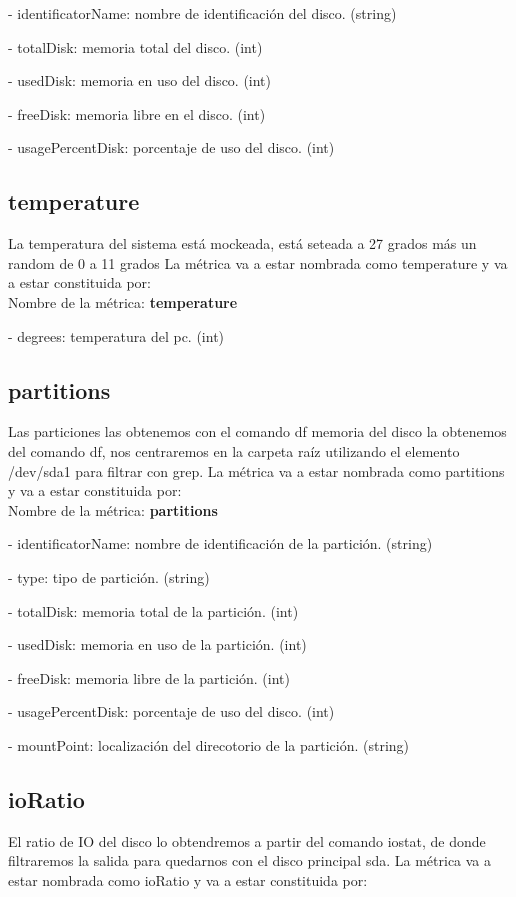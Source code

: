 \documentclass[ spanish, a4paper, 12pt, oneside]{report}
\begin{document}
\hyp{} identificatorName: nombre de identificación del disco. (string)
 
\hyp{} totalDisk: memoria total del disco. (int)
 
\hyp{} usedDisk: memoria en uso del disco. (int)
 
\hyp{} freeDisk: memoria libre en el disco. (int)
 
\hyp{} usagePercentDisk: porcentaje de uso del disco. (int)

\subsection{temperature}
La temperatura del sistema está mockeada, está seteada a 27 grados más un random de 0 a 11 grados 
La métrica va a estar nombrada como temperature y va a estar constituida por:\\
  
Nombre de la métrica: \textbf{temperature}
 
\hyp{} degrees: temperatura del pc. (int)

\subsection{partitions}
Las particiones las obtenemos con el comando df memoria del disco la obtenemos del comando df, nos centraremos en la carpeta raíz utilizando 
el elemento /dev/sda1 para filtrar con grep. La métrica va a estar nombrada como partitions y va a estar constituida por:\\
   
Nombre de la métrica: \textbf{partitions}
  
\hyp{} identificatorName: nombre de identificación de la partición. (string)

\hyp{} type: tipo de partición. (string)
  
\hyp{} totalDisk: memoria total de la partición. (int)
  
\hyp{} usedDisk: memoria en uso de la partición. (int)
  
\hyp{} freeDisk: memoria libre de la partición. (int)
  
\hyp{} usagePercentDisk: porcentaje de uso del disco. (int)
   
\hyp{} mountPoint: localización del direcotorio de la partición. (string)

\subsection{ioRatio}
El ratio de IO del disco lo obtendremos a partir del comando iostat, de donde filtraremos la salida para quedarnos con el disco principal sda.
La métrica va a estar nombrada como ioRatio y va a estar constituida por:\\
 
\end{document}

